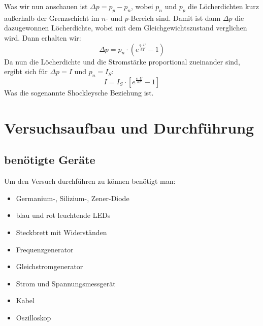 \documentclass[fontsize=12pt]{scrartcl}
\begin{document}
\newpage
\noindent
Was wir nun anschauen ist $\Delta p = p_p-p_{n}$, wobei $p_{n}$ und $p_p$ die Löcherdichten kurz außerhalb der Grenzschicht im $n$- und $p$-Bereich sind. Damit ist dann $\Delta p$ die dazugewonnen Löcherdichte, wobei mit dem Gleichgewichtszustand verglichen wird. Dann erhalten wir:
\begin{equation}
\Delta p = p_n \cdot (e^{\frac{q\cdot U}{kT} } - 1)
\end{equation}
Da nun die Löcherdichte und  die Stromstärke proportional zueinander sind, ergibt sich für $\Delta p = I$ und $p_n = I_S$:
\begin{equation}
I=I_S\cdot[e^{\frac{e\cdot U}{kT}}-1]
\end{equation}
\noindent
Was die sogenannte Shockleysche Beziehung ist. 
\section{Versuchsaufbau und Durchführung}

\subsection{benötigte Geräte}

Um den Versuch durchführen zu können benötigt man:
\begin{itemize}
\item	Germanium-, Silizium-, Zener-Diode
\item	blau und rot leuchtende LEDs
\item	Steckbrett mit Widerständen
\item	Frequenzgenerator
\item	Gleichstromgenerator
\item	Strom und Spannungsmessgerät
\item	Kabel
\item	Oszilloskop
\end{itemize}
\end{document}
